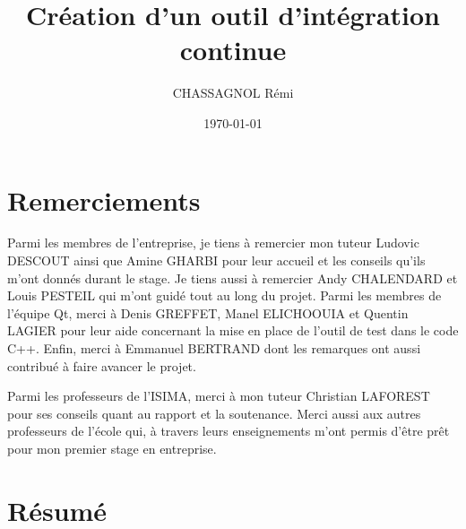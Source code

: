 \documentclass[a4paper]{article}
\title{Création d'un outil d'intégration continue}
\author{CHASSAGNOL Rémi}
\date{\today}
\begin{document}

\clearpage{}

\thispagestyle{empty}
\tableofcontents
\clearpage{}

\section*{Remerciements}
\thispagestyle{empty}

\doublespacing


Parmi les membres de l'entreprise, je tiens à remercier mon tuteur Ludovic
DESCOUT ainsi que Amine GHARBI pour leur accueil et les conseils qu'ils m'ont
donnés durant le stage. Je tiens aussi à remercier Andy CHALENDARD et Louis
PESTEIL qui m'ont guidé tout au long du projet. Parmi les membres de l'équipe
Qt, merci à Denis GREFFET, Manel ELICHOOUIA et Quentin LAGIER pour leur aide
concernant la mise en place de l'outil de test dans le code C++. Enfin,
merci à Emmanuel BERTRAND dont les remarques ont aussi contribué à faire avancer
le projet.

Parmi les professeurs de l'ISIMA, merci à mon tuteur Christian LAFOREST pour ses
conseils quant au rapport et la soutenance. Merci aussi aux autres
professeurs de l'école qui, à travers leurs enseignements m'ont permis d'être
prêt pour mon premier stage en entreprise.

\onehalfspacing

\clearpage{}

\listoffigures
\clearpage{}

\section*{Résumé}
\end{document}
